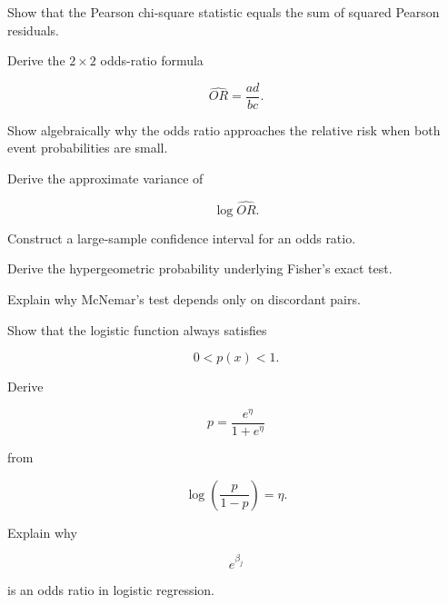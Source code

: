 \begin{exercise}[3]
Show that the Pearson chi-square statistic equals the sum of squared
Pearson residuals.
\end{exercise}

\begin{exercise}[3]
Derive the \(2\times2\) odds-ratio formula

\[
\widehat{OR}
=
\frac{ad}{bc}.
\]
\end{exercise}

\begin{exercise}[3]
Show algebraically why the odds ratio approaches the relative risk when
both event probabilities are small.
\end{exercise}

\begin{exercise}[3]
Derive the approximate variance of

\[
\log\widehat{OR}.
\]
\end{exercise}

\begin{exercise}[3]
Construct a large-sample confidence interval for an odds ratio.
\end{exercise}

\begin{exercise}[3]
Derive the hypergeometric probability underlying Fisher's exact test.
\end{exercise}

\begin{exercise}[3]
Explain why McNemar's test depends only on discordant pairs.
\end{exercise}

\begin{exercise}[3]
Show that the logistic function always satisfies

\[
0<p(x)<1.
\]
\end{exercise}

\begin{exercise}[3]
Derive

\[
p
=
\frac{
e^\eta
}{
1+e^\eta
}
\]

from

\[
\log
\left(
\frac{p}{1-p}
\right)
=
\eta.
\]
\end{exercise}

\begin{exercise}[3]
Explain why

\[
e^{\beta_j}
\]

is an odds ratio in logistic regression.
\end{exercise}

